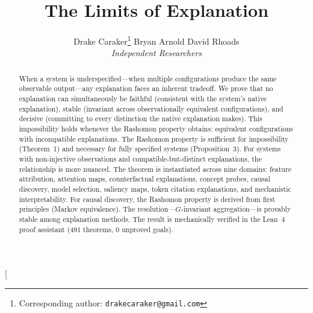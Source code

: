 \documentclass[twocolumn]{article}
\title{The Limits of Explanation}
\author{
  Drake Caraker\thanks{Corresponding author: \texttt{drakecaraker@gmail.com}} \quad
  Bryan Arnold \quad
  David Rhoads \\[4pt]
  \textit{Independent Researchers}
}
\date{}
\begin{document}
\twocolumn[
  \begin{@twocolumnfalse}
  \maketitle





\begin{abstract}
When a system is underspecified---when multiple configurations produce
the same observable output---any explanation faces an inherent
tradeoff. We prove that no explanation can simultaneously be faithful
(consistent with the system's native explanation), stable (invariant
across observationally equivalent configurations), and decisive
(committing to every distinction the native explanation makes). This
impossibility holds whenever the Rashomon property obtains: equivalent
configurations with incompatible explanations. The Rashomon property is sufficient for impossibility (Theorem~1) and necessary
for fully specified systems (Proposition~3). For systems with non-injective observations
and compatible-but-distinct explanations, the relationship is more nuanced. The theorem is instantiated across nine
domains: feature attribution, attention maps, counterfactual
explanations, concept probes, causal discovery, model selection,
saliency maps, token citation explanations, and mechanistic
interpretability. For causal discovery, the Rashomon property is derived
from first principles (Markov equivalence). The resolution---$G$-invariant
aggregation---is provably stable among explanation methods. The result is mechanically
verified in the Lean~4 proof assistant (491 theorems, 0 unproved goals).
\end{abstract}


\end{@twocolumnfalse}
\end{document}
